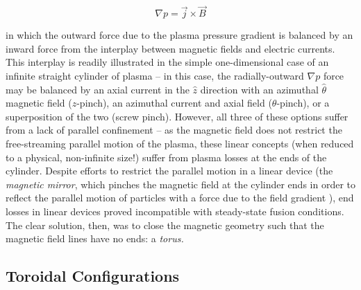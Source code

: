\begin{equation}\label{eq:MHDeq}
 \nabla p = \vec{j} \times \vec{B}
\end{equation}

\noindent in which the outward force due to the plasma pressure gradient is balanced by an inward force from the interplay between magnetic fields and electric currents.  This interplay is readily illustrated in the simple one-dimensional case of an infinite straight cylinder of plasma -- in this case, the radially-outward $\nabla p$ force may be balanced by an axial current in the $\hat{z}$ direction with an azimuthal $\hat{\theta}$ magnetic field ($z$-pinch), an azimuthal current and axial field ($\theta$-pinch), or a superposition of the two (screw pinch).  However, all three of these options suffer from a lack of parallel confinement -- as the magnetic field does not restrict the free-streaming parallel motion of the plasma, these linear concepts (when reduced to a physical, non-infinite size!) suffer from plasma losses at the ends of the cylinder.  Despite efforts to restrict the parallel motion in a linear device (\eg the \emph{magnetic mirror}, which pinches the magnetic field at the cylinder ends in order to reflect the parallel motion of particles with a force due to the field gradient \cite{Kesner1982}), end losses in linear devices proved incompatible with steady-state fusion conditions.  The clear solution, then, was to close the magnetic geometry such that the magnetic field lines have no ends: a \emph{torus.}

\subsection{Toroidal Configurations}\label{subsec:intro_toroidal}

